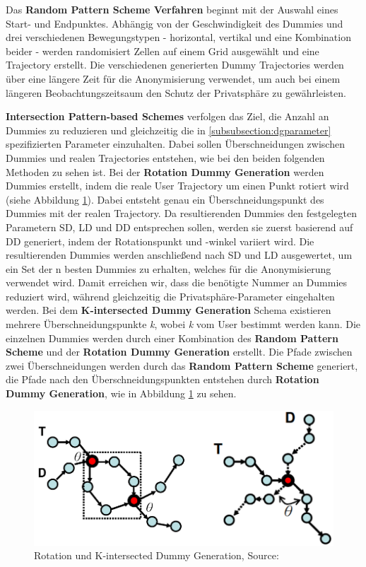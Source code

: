 Das \textbf{Random Pattern Scheme Verfahren} \cite{You2007} beginnt mit der Auswahl eines Start- und Endpunktes. Abhängig von der Geschwindigkeit des Dummies und drei verschiedenen Bewegungstypen - horizontal, vertikal und eine Kombination beider - werden randomisiert Zellen auf einem Grid ausgewählt und eine Trajectory erstellt. Die verschiedenen generierten Dummy Trajectories werden über eine längere Zeit für die Anonymisierung verwendet, um auch bei einem längeren Beobachtungszeitsaum den Schutz der Privatsphäre zu gewährleisten.

\textbf{Intersection Pattern-based Schemes} \cite{Lei2012} verfolgen das Ziel, die Anzahl an Dummies zu reduzieren und gleichzeitig die in \ref{subsubsection:dgparameter} spezifizierten Parameter einzuhalten. Dabei sollen Überschneidungen zwischen Dummies und realen Trajectories entstehen, wie bei den beiden folgenden Methoden zu sehen ist. Bei der \textbf{Rotation Dummy Generation} werden Dummies erstellt, indem die reale User Trajectory um einen Punkt rotiert wird (siehe Abbildung \ref{fig_Lei2012}). Dabei entsteht genau ein Überschneidungspunkt des Dummies mit der realen Trajectory. Da resultierenden Dummies den festgelegten Parametern SD, LD und DD entsprechen sollen, werden sie zuerst basierend auf DD generiert, indem der Rotationspunkt und -winkel variiert wird. Die resultierenden Dummies werden anschließend nach SD und LD ausgewertet, um ein Set der n besten Dummies zu erhalten, welches für die Anonymisierung verwendet wird. Damit erreichen wir, dass die benötigte Nummer an Dummies reduziert wird, während gleichzeitig die Privatsphäre-Parameter eingehalten werden. Bei dem \textbf{K-intersected Dummy Generation} Schema existieren mehrere Überschneidungspunkte \textit{k}, wobei \textit{k} vom User bestimmt werden kann. Die einzelnen Dummies werden durch einer Kombination des \textbf{Random Pattern Scheme} und der \textbf{Rotation Dummy Generation} erstellt. Die Pfade zwischen zwei Überschneidungen werden durch das \textbf{Random Pattern Scheme} generiert, die Pfade nach den Überschneidungspunkten entstehen durch \textbf{Rotation Dummy Generation}, wie in Abbildung \ref{fig_Lei2012} zu sehen.
\begin{figure}[!h]
	\centering
	\includegraphics[width=\linewidth]{Bilder/Lei2012.png}
	\caption{Rotation und K-intersected Dummy Generation, Source: \protect\cite{Lei2012}}
	\label{fig_Lei2012}
\end{figure}

